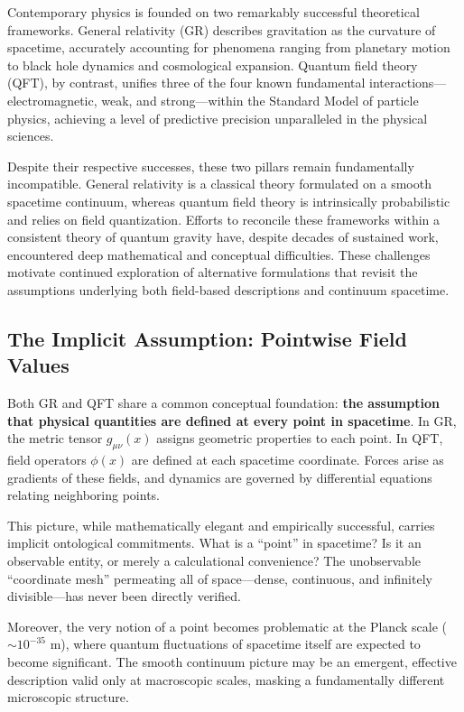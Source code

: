 \documentclass[12pt,letterpaper]{article}
\begin{document}
Contemporary physics is founded on two remarkably successful theoretical frameworks. General relativity (GR) describes gravitation as the curvature of spacetime, accurately accounting for phenomena ranging from planetary motion to black hole dynamics and cosmological expansion. Quantum field theory (QFT), by contrast, unifies three of the four known fundamental interactions—electromagnetic, weak, and strong—within the Standard Model of particle physics, achieving a level of predictive precision unparalleled in the physical sciences.

Despite their respective successes, these two pillars remain fundamentally incompatible. General relativity is a classical theory formulated on a smooth spacetime continuum, whereas quantum field theory is intrinsically probabilistic and relies on field quantization. Efforts to reconcile these frameworks within a consistent theory of quantum gravity have, despite decades of sustained work, encountered deep mathematical and conceptual difficulties. These challenges motivate continued exploration of alternative formulations that revisit the assumptions underlying both field-based descriptions and continuum spacetime.


\subsection{The Implicit Assumption: Pointwise Field Values}
\label{subsec:pointwise_fields}

Both GR and QFT share a common conceptual foundation: \textbf{the assumption that physical quantities are defined at every point in spacetime}. In GR, the metric tensor $g_{\mu\nu}(x)$ assigns geometric properties to each point. In QFT, field operators $\phi(x)$ are defined at each spacetime coordinate. Forces arise as gradients of these fields, and dynamics are governed by differential equations relating neighboring points.

This picture, while mathematically elegant and empirically successful, carries implicit ontological commitments. What is a ``point'' in spacetime? Is it an observable entity, or merely a calculational convenience? The unobservable ``coordinate mesh'' permeating all of space—dense, continuous, and infinitely divisible—has never been directly verified.

Moreover, the very notion of a point becomes problematic at the Planck scale ($\sim 10^{-35}$ m), where quantum fluctuations of spacetime itself are expected to become significant. The smooth continuum picture may be an emergent, effective description valid only at macroscopic scales, masking a fundamentally different microscopic structure.
\end{document}
